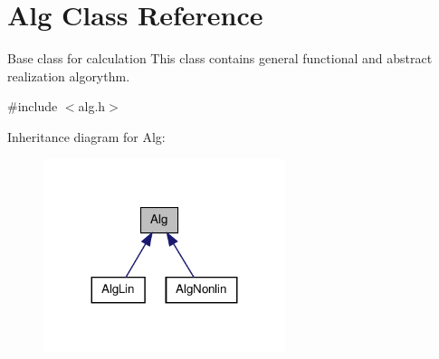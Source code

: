 \hypertarget{classAlg}{
\section{Alg Class Reference}
\label{classAlg}
}


Base class for calculation  This class contains general functional and abstract realization algorythm.  




{\ttfamily \#include $<$alg.h$>$}



Inheritance diagram for Alg:
\nopagebreak
\begin{figure}[H]
\begin{center}
\leavevmode
\includegraphics[width=200pt]{classAlg__inherit__graph}
\end{center}
\end{figure}
